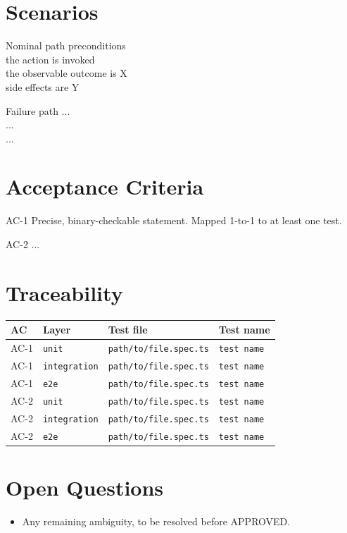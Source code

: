 \section{Scenarios}

\begin{scenario}{Nominal path}
\Given preconditions \\
\When the action is invoked \\
\Then the observable outcome is X \\
\And side effects are Y
\end{scenario}

\begin{scenario}{Failure path}
\Given ... \\
\When ... \\
\Then ...
\end{scenario}

\section{Acceptance Criteria}

\begin{ac}{AC-1}
Precise, binary-checkable statement. Mapped 1-to-1 to at least one test.
\end{ac}

\begin{ac}{AC-2}
...
\end{ac}

\section{Traceability}

\begin{center}
\begin{tabular}{@{}llll@{}}
\toprule
AC & Layer & Test file & Test name \\
\midrule
AC-1 & \texttt{unit} & \texttt{path/to/file.spec.ts} & \texttt{test name} \\
AC-1 & \texttt{integration} & \texttt{path/to/file.spec.ts} & \texttt{test name} \\
AC-1 & \texttt{e2e} & \texttt{path/to/file.spec.ts} & \texttt{test name} \\
AC-2 & \texttt{unit} & \texttt{path/to/file.spec.ts} & \texttt{test name} \\
AC-2 & \texttt{integration} & \texttt{path/to/file.spec.ts} & \texttt{test name} \\
AC-2 & \texttt{e2e} & \texttt{path/to/file.spec.ts} & \texttt{test name} \\
\bottomrule
\end{tabular}
\end{center}

\section{Open Questions}
\begin{itemize}[leftmargin=1.2em]
  \item Any remaining ambiguity, to be resolved before \textsc{APPROVED}.
\end{itemize}


